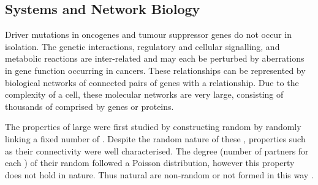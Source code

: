 \subsection{Systems and Network Biology}

Driver \glspl{mutation} in \glspl{oncogene} and \gls{tumour suppressor} genes do not occur in isolation. The genetic interactions, regulatory and cellular signalling, and metabolic reactions are inter-related and may each be perturbed by aberrations in gene function occurring in \glspl{cancer}. These relationships can be represented by biological networks of connected pairs of genes with a relationship. Due to the complexity of a cell, these molecular networks are very large, consisting of thousands of  comprised by genes or proteins. 

The properties of large  were first studied by constructing random  by randomly linking a fixed number of  \citep{Erdos1959, Erdos1960}. Despite the random nature of these , properties such as their connectivity were well characterised. The  degree (number of partners for each ) of their random  followed a Poisson distribution, however this property does not hold in nature. Thus natural  are non-random or not formed in this way \citep{Barabasi2004}. 

